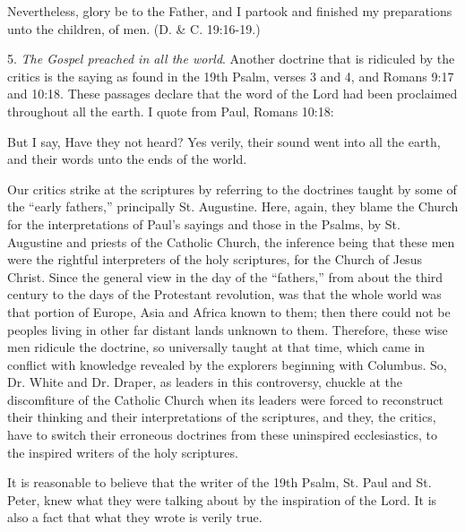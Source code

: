 Nevertheless, glory be to the Father, and I partook and finished my preparations unto the
children, of men. (D. \& C. 19:16-19.)

5. \textit{The Gospel preached in all the world}. Another doctrine that is ridiculed by the critics is
the saying as found in the 19th Psalm, verses 3 and 4, and Romans 9:17 and 10:18. These
passages declare that the word of the Lord had been proclaimed throughout all the earth. I
quote from Paul, Romans 10:18:

But I say, Have they not heard? Yes verily, their sound went into all the earth, and their
words unto the ends of the world.

Our critics strike at the scriptures by referring to the doctrines taught by some of the ``early
fathers,'' principally St. Augustine. Here, again, they blame the Church for the interpretations
of Paul's sayings and those in the Psalms, by St. Augustine and priests of the Catholic
Church, the inference being that these men were the rightful interpreters of the holy
scriptures, for the Church of Jesus Christ. Since the general view in the day of the ``fathers,''
from about the third century to the days of the Protestant revolution, was that the whole
world was that portion of Europe, Asia and Africa known to them; then there could not be
peoples living in other far distant lands unknown to them. Therefore, these wise men ridicule
the doctrine, so universally taught at that time, which came in conflict with knowledge
revealed by the explorers beginning with Columbus. So, Dr. White and Dr. Draper, as leaders
in this controversy, chuckle at the discomfiture of the Catholic Church when its leaders were
forced to reconstruct their thinking and their interpretations of the scriptures, and they, the
critics, have to switch their erroneous doctrines from these uninspired ecclesiastics, to the
inspired writers of the holy scriptures.

It is reasonable to believe that the writer of the 19th Psalm, St. Paul and St. Peter, knew what
they were talking about by the inspiration of the Lord. It is also a fact that what they wrote is
verily true.

